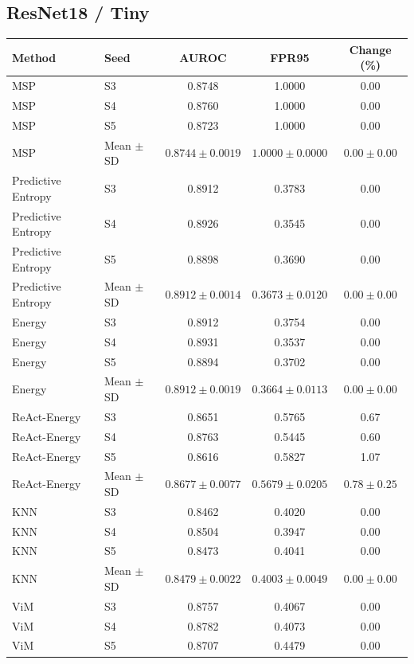 \clearpage
\subsection*{ResNet18 / Tiny}
\begingroup
\footnotesize
\setlength{\tabcolsep}{3pt}
\renewcommand{\arraystretch}{1.1}
\begin{longtable}{@{}llccc@{}}
\toprule
Method & Seed & AUROC & FPR95 & Change (\%) \\
\midrule
\endhead
\bottomrule
\endlastfoot
MSP & S3 & 0.8748 & 1.0000 & 0.00 \\
MSP & S4 & 0.8760 & 1.0000 & 0.00 \\
MSP & S5 & 0.8723 & 1.0000 & 0.00 \\
MSP & Mean $\pm$ SD & $0.8744 \pm 0.0019$ & $1.0000 \pm 0.0000$ & $0.00 \pm 0.00$ \\
Predictive Entropy & S3 & 0.8912 & 0.3783 & 0.00 \\
Predictive Entropy & S4 & 0.8926 & 0.3545 & 0.00 \\
Predictive Entropy & S5 & 0.8898 & 0.3690 & 0.00 \\
Predictive Entropy & Mean $\pm$ SD & $0.8912 \pm 0.0014$ & $0.3673 \pm 0.0120$ & $0.00 \pm 0.00$ \\
Energy & S3 & 0.8912 & 0.3754 & 0.00 \\
Energy & S4 & 0.8931 & 0.3537 & 0.00 \\
Energy & S5 & 0.8894 & 0.3702 & 0.00 \\
Energy & Mean $\pm$ SD & $0.8912 \pm 0.0019$ & $0.3664 \pm 0.0113$ & $0.00 \pm 0.00$ \\
ReAct-Energy & S3 & 0.8651 & 0.5765 & 0.67 \\
ReAct-Energy & S4 & 0.8763 & 0.5445 & 0.60 \\
ReAct-Energy & S5 & 0.8616 & 0.5827 & 1.07 \\
ReAct-Energy & Mean $\pm$ SD & $0.8677 \pm 0.0077$ & $0.5679 \pm 0.0205$ & $0.78 \pm 0.25$ \\
KNN & S3 & 0.8462 & 0.4020 & 0.00 \\
KNN & S4 & 0.8504 & 0.3947 & 0.00 \\
KNN & S5 & 0.8473 & 0.4041 & 0.00 \\
KNN & Mean $\pm$ SD & $0.8479 \pm 0.0022$ & $0.4003 \pm 0.0049$ & $0.00 \pm 0.00$ \\
ViM & S3 & 0.8757 & 0.4067 & 0.00 \\
ViM & S4 & 0.8782 & 0.4073 & 0.00 \\
ViM & S5 & 0.8707 & 0.4479 & 0.00 \\

\end{longtable}
